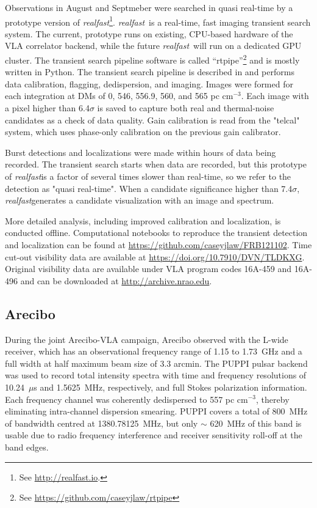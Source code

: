 \documentclass{emulateapj}
\newcommand{\rf}{\emph{realfast}}
\begin{document}
Observations in August and Septmeber were searched in quasi real-time by a prototype version of \rf\footnote{See \url{http://realfast.io}.}. \rf\ is a real-time, fast imaging transient search system. The current, prototype runs on existing, CPU-based hardware of the VLA correlator backend, while the future \rf\ will run on a dedicated GPU cluster. The transient search pipeline software is called ``rtpipe''\footnote{See \url{https://github.com/caseyjlaw/rtpipe}} and is mostly written in Python. The transient search pipeline is described in \citet{2015ApJ...807...16L} and performs data calibration, flagging, dedispersion, and imaging. Images were formed for each integration at DMs of 0, 546, 556.9, 560, and 565 pc cm$^{-3}$. Each image with a pixel higher than 6.4$\sigma$ is saved to capture both real and thermal-noise candidates as a check of data quality. Gain calibration is read from the "telcal" system, which uses phase-only calibration on the previous gain calibrator.

Burst detections and localizations were made within hours of data being recorded. The transient search starts when data are recorded, but this prototype of \rf is a factor of several times slower than real-time, so we refer to the detection as "quasi real-time". When a candidate significance higher than 7.4$\sigma$, \rf generates a candidate visualization with an image and spectrum. 

More detailed analysis, including improved calibration and localization, is conducted offline. Computational notebooks to reproduce the transient detection and localization can be found at \url{https://github.com/caseyjlaw/FRB121102}. Time cut-out visibility data are available at \url{https://doi.org/10.7910/DVN/TLDKXG}. Original visibility data are available under VLA program codes 16A-459 and 16A-496 and can be downloaded at \url{http://archive.nrao.edu}.

\subsection{Arecibo}

During the joint Arecibo-VLA campaign, Arecibo observed with the L-wide receiver, which has an observational frequency range of 1.15 to 1.73~GHz and a full width at half maximum beam size of 3.3 arcmin. The PUPPI pulsar backend was used to record total intensity spectra with time and frequency resolutions of 10.24~$\mu$s and 1.5625~MHz, respectively, and full Stokes polarization information. Each frequency channel was coherently dedispersed to 557 pc cm$^{-3}$, thereby eliminating intra-channel dispersion smearing. PUPPI covers a total of 800~MHz of bandwidth centred at 1380.78125~MHz, but only $\sim$ 620~MHz of this band is usable due to radio frequency interference and receiver sensitivity roll-off at the band edges.
\end{document}
